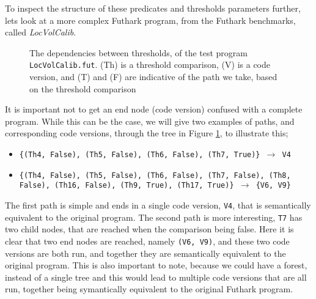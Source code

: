To inspect the structure of these predicates and thresholds parameters further, 
lets look at a more complex Futhark program, from the Futhark benchmarks, 
called \textit{LocVolCalib}.
\begin{figure}
  \centering
  
  \caption{The dependencies between thresholds, of the test program 
  \texttt{LocVolCalib.fut}. (Th) is a threshold comparison, (V) is a code 
version, and (T) and (F) are indicative of the path we take, based on the 
threshold comparison}
  \label{LocVolCalibTree}
\end{figure}
\noindent It is important not to get an end node (code version) confused with a 
complete program. While this can be the case, we will give two examples of 
paths, and corresponding code versions, through the tree in Figure 
\ref{LocVolCalibTree}, to illustrate this;
\begin{itemize}
  \item \texttt{\{(Th4, False), (Th5, False), (Th6, False), (Th7, True)\} $\to$ 
    V4}
  \item \texttt{\{(Th4, False), (Th5, False), (Th6, False), (Th7, False), (Th8, 
    False), (Th16, False), (Th9, True), (Th17, True)\} $\to$ \{V6, V9\}}
\end{itemize} 

The first path is simple and ends in a single code version, \texttt{V4}, that 
is semantically equivalent to the original program. The second path is more 
interesting, \texttt{T7} has two child nodes, that are reached when the 
comparison being false. Here it is clear that two end nodes are reached, namely 
\texttt{(V6, V9)}, and these two code versions are both run, and together they 
are semantically equivalent to the original program.  This is also important to 
note, because we could have a forest, instead of a single tree and this would 
lead to multiple code versions that are all run, together being symantically 
equivalent to the original Futhark program. 
